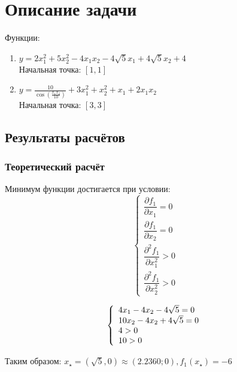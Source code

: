\documentclass[a4paper,12pt]{article}
\begin{document}


\newpage

\section{Описание задачи}
 
Функции: 
\begin{enumerate}
\item $y = 2 x_1^2 + 5 x_2^2 - 4 x_1 x_2 - 4\sqrt{5} x_1 + 4 \sqrt{5} x_2 + 4$ \\Начальная точка: $[1, 1]$
\item $y = \frac {10} {\cos({\frac {x_1 x_2} {10}})} + 3 x_1^2 + x_2^2 + x_1 + 2 x_1 x_2$
\\Начальная точка: $[3, 3]$
\end{enumerate}

\subsection{Результаты расчётов}
\subsubsection{Теоретический расчёт}
Минимум функции достигается при условии:
\[
\left\{ 
\begin{array}{l}
  \dfrac{\partial f_1}{\partial x_1} = 0 \\
  \dfrac{\partial f_1}{\partial x_2} = 0 \\
  \dfrac{\partial^2 f_1}{\partial x_1^2} > 0 \\
  \dfrac{\partial^2 f_1}{\partial x_2^2} > 0
\end{array} \right.
\]

\[
\left\{ 
\begin{array}{l l l}
	4 x_1 - 4 x_2 - 4 \sqrt{5} = 0 \\
	10 x_2 - 4 x_2 + 4 \sqrt{5} = 0 \\
	4 > 0 \\
	10 > 0
\end{array} \right.
\]

Таким образом:
$x_{\star} = \left( \sqrt{5}, 0\right) \approx (2.2360; 0), f_1(x_{\star}) = -6$
\end{document}
